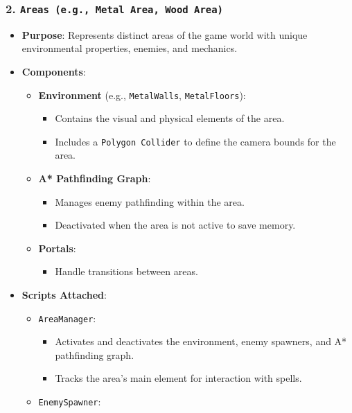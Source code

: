 \documentclass[10pt,twocolumn]{article}
\begin{document}
\subsubsection{2. \texttt{Areas (e.g., Metal Area, Wood Area)}}
\begin{itemize}
    \item \textbf{Purpose}: Represents distinct areas of the game world with unique environmental properties, enemies, and mechanics.
    \item \textbf{Components}:
    \begin{itemize}
        \item \textbf{Environment} (e.g., \texttt{MetalWalls}, \texttt{MetalFloors}):
        \begin{itemize}
            \item Contains the visual and physical elements of the area.
            \item Includes a \texttt{Polygon Collider} to define the camera bounds for the area.
        \end{itemize}
        \item \textbf{A* Pathfinding Graph}:
        \begin{itemize}
            \item Manages enemy pathfinding within the area.
            \item Deactivated when the area is not active to save memory.
        \end{itemize}
        \item \textbf{Portals}:
        \begin{itemize}
            \item Handle transitions between areas.
        \end{itemize}
    \end{itemize}
    \item \textbf{Scripts Attached}:
    \begin{itemize}
        \item \texttt{AreaManager}:
        \begin{itemize}
            \item Activates and deactivates the environment, enemy spawners, and A* pathfinding graph.
            \item Tracks the area's main element for interaction with spells.
        \end{itemize}
        \item \texttt{EnemySpawner}:
        \begin{itemize}

\end{itemize}
\end{itemize}
\end{itemize}
\end{document}
